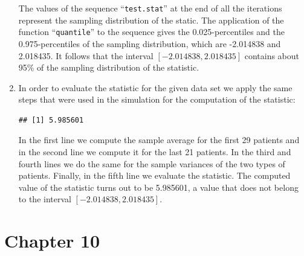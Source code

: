 \documentclass[
]{krantz}
\makeatletter
\newenvironment{Shaded}{\begin{snugshade}}{\end{snugshade}}
\newcommand{\DecValTok}[1]{\textcolor[rgb]{0.00,0.00,0.81}{#1}}
\newcommand{\KeywordTok}[1]{\textcolor[rgb]{0.13,0.29,0.53}{\textbf{#1}}}
\newcommand{\NormalTok}[1]{#1}
\newcommand{\OperatorTok}[1]{\textcolor[rgb]{0.81,0.36,0.00}{\textbf{#1}}}
\newcommand{\StringTok}[1]{\textcolor[rgb]{0.31,0.60,0.02}{#1}}
\newenvironment{kframe}{%
\medskip{}
\setlength{\fboxsep}{.8em}
 \def\at@end@of@kframe{}%
 \ifinner\ifhmode%
  \def\at@end@of@kframe{\end{minipage}}%
  \begin{minipage}{\columnwidth}%
 \fi\fi%
 \def\FrameCommand##1{\hskip\@totalleftmargin \hskip-\fboxsep
 \colorbox{shadecolor}{##1}\hskip-\fboxsep
     \hskip-\linewidth \hskip-\@totalleftmargin \hskip\columnwidth}%
 \MakeFramed {\advance\hsize-\width
   \@totalleftmargin\z@ \linewidth\hsize
   \@setminipage}}%
 {\par\unskip\endMakeFramed%
 \at@end@of@kframe}
\renewenvironment{Shaded}{\begin{kframe}}{\end{kframe}}
\theoremstyle{definition}
\theoremstyle{definition}
\theoremstyle{definition}
\theoremstyle{remark}
\makeatother
\begin{document}
\begin{enumerate}
  The values of the sequence ``\texttt{test.stat}'' at the end of all the
  iterations represent the sampling distribution of the static. The
  application of the function ``\texttt{quantile}'' to the sequence gives the
  0.025-percentiles and the 0.975-percentiles of the sampling
  distribution, which are -2.014838 and 2.018435. It follows that the
  interval \([-2.014838, 2.018435]\) contains about 95\% of the sampling
  distribution of the statistic.
\item
  In order to evaluate the statistic
  for the given data set we apply the same steps that were used in the
  simulation for the computation of the statistic:

\begin{Shaded}
\end{Shaded}

\begin{verbatim}
## [1] 5.985601
\end{verbatim}

  In the first line we compute the sample average for the first 29
  patients and in the second line we compute it for the last 21 patients.
  In the third and fourth lines we do the same for the sample variances of
  the two types of patients. Finally, in the fifth line we evaluate the
  statistic. The computed value of the statistic turns out to be 5.985601,
  a value that does not belong to the interval \([-2.014838, 2.018435]\).
\end{enumerate}

\hypertarget{chapter-10}{%
\section*{Chapter 10}\label{chapter-10}}
\end{document}

